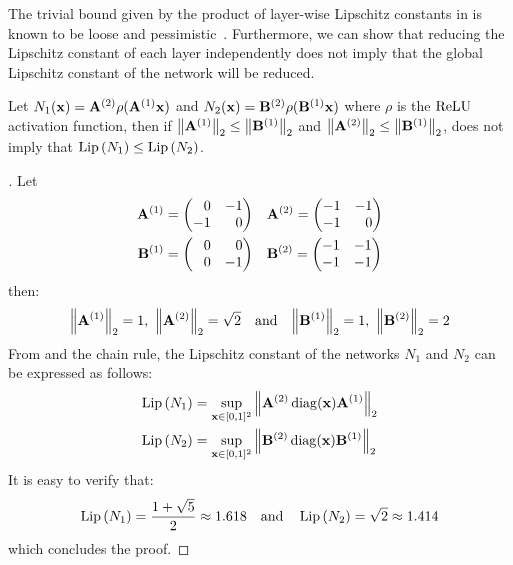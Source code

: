 The trivial bound given by the product of layer-wise Lipschitz constants in  is known to be loose and pessimistic~\citet{combettes2019lipschitz}.
Furthermore, we can show that reducing the Lipschitz constant of each layer independently does not imply that the global Lipschitz constant of the network will be reduced. 
\begin{proposition} \label{proposition:ch3-limit_bound_lipschitz}
  Let $N_1(\mathbf{x}) = \mathbf{A}^{(2)} \rho(\mathbf{A}^{(1)} \mathbf{x})$ and $N_2(\mathbf{x}) = \mathbf{B}^{(2)} \rho(\mathbf{B}^{(1)} \mathbf{x})$ where $\rho$ is the $\operatorname{ReLU}$ activation function, then if $\norm{\mathbf{A}^{(1)}}_2 \leq \norm{\mathbf{B}^{(1)}}_2$ and $\norm{\mathbf{A}^{(2)}}_2 \leq \norm{\mathbf{B}^{(1)}}_2$, does not imply that $\operatorname{Lip}{(N_1)} \leq \operatorname{Lip}{(N_2)}$.
\end{proposition}
\begin{proof}[]
  Let
  \begin{align*}
    \Amat^{(1)} &= \leftmatrix 
      \phantom{+}0 & -1 \\ -1 & \phantom{+}0
    \rightmatrix \quad
    \Amat^{(2)}  = \leftmatrix
      -1 & -1 \\ -1 & \phantom{+}0
    \rightmatrix \\
    \Bmat^{(1)} &= \leftmatrix
      \phantom{+}0 & \phantom{+}0 \\ \phantom{+}0 & -1
    \rightmatrix \quad
    \Bmat^{(2)} = \leftmatrix
      -1 & -1 \\ -1 & -1
    \rightmatrix
  \end{align*}
  then: \vspace{-0.5cm}
  \begin{equation*}
    \norm{\mathbf{A}^{(1)}}_2 = 1,\ \norm{\mathbf{A}^{(2)}}_2 = \sqrt{2}
    \quad \text{and} \quad
    \norm{\mathbf{B}^{(1)}}_2 = 1,\ \norm{\mathbf{B}^{(2)}}_2 = 2
  \end{equation*}
  From  and the chain rule, the Lipschitz constant of the networks $N_1$ and $N_2$ can be expressed as follows:
  \begin{align*}
    \lip{N_1} &= \sup_{\xvec \in [0, 1]^2} \norm{\Amat^{(2)} \diag\left(\xvec\right) \Amat^{(1)}}_2 \\
    \lip{N_2} &= \sup_{\xvec \in [0, 1]^2} \norm{\Bmat^{(2)} \diag\left(\xvec\right) \Bmat^{(1)}}_2
  \end{align*}
  It is easy to verify that:
  \begin{equation*}
    \operatorname{Lip}{(N_1)} = \frac{1 + \sqrt{5}}{2} \approx 1.618 \quad \text{and} \quad \operatorname{Lip}{(N_2)} = \sqrt{2} \approx 1.414
  \end{equation*}
  which concludes the proof.
\end{proof}

